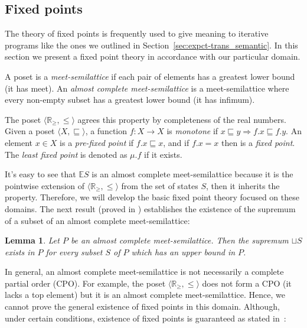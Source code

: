 \documentclass{eptcs}
\theoremstyle{plain}
\newtheorem{lemma}[theorem]{Lemma}
\theoremstyle{definition}
\newcommand{\Real}{\ensuremath{\mathbb R}}
\newcommand{\RealPos}{\ensuremath{\Real_\geq}}
\newcommand{\lit}[1]{\ensuremath{\mathit{#1}}}
\newcommand{\totype}{\ensuremath{\ra}}
\newcommand{\ES}{\lit{\mathbb{E}S}}
\newcommand{\ra}{\ensuremath{\rightarrow}}
\newcommand{\Impl}{\ensuremath{\Rightarrow}}
\newcommand{\slq}{\ensuremath{\sqsubseteq}}
\newcommand{\remark}[2]{}
\newcommand{\remarkD}[1]{\remark{D}{#1}}
\begin{document}
\subsection{Fixed points}

The theory of fixed points is frequently used to give meaning to iterative
programs like the ones we outlined in Section~\ref{sec:expct-trans_semantic}. In this
section we present a fixed point theory in accordance with our particular domain.

A poset is a \emph{\mbox{meet-semilattice}} if each pair of elements has a greatest
lower bound (it has meet). An \emph{almost complete \mbox{meet-semilattice}} is a
meet-semilattice where every
non-empty subset has a greatest lower bound (it has infimum).
\remarkD{almost complete \Impl local cpo (sale en paper). Creo qe esto
  ultimo es mas debil. Si algo no anda con las expectations se puede
  repensar con local cpo}
The poset $\langle\RealPos,\leq\rangle$ agrees this property by completeness of the real numbers.
Given a poset $\langle X, \slq \rangle$, a function $f:X \totype X$ is
\emph{monotone} if $x\slq y \Impl f.x\slq f.y$.
An element $x \in X$ is a \emph{pre-fixed point} if $f.x \slq x$, and if $f.x =
x$ then is a \emph{fixed point}.  The \emph{least fixed point} is denoted
as $\mu.f$ if it exists.

It's easy to see that $\ES$ is an almost complete \mbox{meet-semilattice}
because it is the pointwise extension of $\langle\RealPos,\leq\rangle$ from the set of states
$S$, then it inherits the property.
Therefore, we will develop the basic
fixed point theory focused on these domains.  The next result (proved in \cite[Lemma
  2.15]{IntroductionLatticeOrderBook}) establishes the existence of the supremum
of a subset of an almost complete \mbox{meet-semilattice}:

\begin{lemma} \label{lem:priestley}
Let $P$ be an almost complete \mbox{meet-semilattice}. Then the supremum $\sqcup
S$ exists in $P$ for every subset $S$ of $P$ which has an upper bound in $P$.
\end{lemma}

In general, an almost complete \mbox{meet-semilattice} is not necessarily a
complete partial order (CPO). For example, the poset $\langle\RealPos,\leq\rangle$ does not
form a CPO (it lacks a top element) but it is an almost complete
\mbox{meet-semilattice}. Hence, we cannot prove the general existence of fixed
points in this domain.  Although, under certain conditions, existence of fixed
points is guaranteed as stated in~\cite[Theorem 1.4]{Mislove93fixedpoints}:
\end{document}
